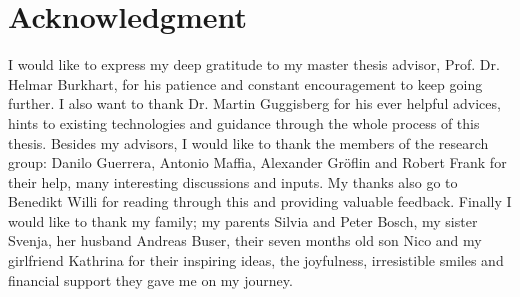 \chapter*{Acknowledgment}
I would like to express my deep gratitude to my master thesis advisor, Prof. Dr. Helmar Burkhart, for his patience and constant encouragement to keep going further.
I also want to thank Dr. Martin Guggisberg for his ever helpful advices, hints to existing technologies and guidance through the whole process of this thesis.
Besides my advisors, I would like to thank the members of the research group: Danilo Guerrera,
Antonio Maffia, Alexander Gr\"oflin and Robert Frank for their help, many interesting discussions and inputs.
My thanks also go to Benedikt Willi for reading through this and providing valuable feedback.
Finally I would like to thank my family; my parents Silvia and Peter Bosch, my sister Svenja, her husband Andreas Buser, their seven months old son Nico and my girlfriend Kathrina for their inspiring ideas, the joyfulness, irresistible smiles and financial support they gave me on my journey.